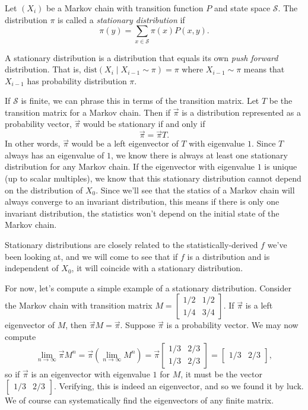\documentclass{problemset}
\newcommand{\mat}[1]{\begin{bmatrix}#1\end{bmatrix}}
\begin{document}
	\begin{definition}
		Let $(X_i)$ be a Markov chain with transition function $P$ and state space $\mathcal S$.  The distribution $\pi$
		is called a \emph{stationary distribution} if
		\[
			\pi(y) = \sum_{x\in\mathcal S} \pi(x)P(x,y).
		\]
	\end{definition}

	A stationary distribution is a distribution that equals its own \emph{push forward} distribution.
	That is, $\text{dist}(X_i\mid X_{i-1}\sim \pi) = \pi$ where $X_{i-1}\sim \pi$ means that $X_{i-1}$
	has probability distribution $\pi$.

	If $\mathcal S$ is finite, we can phrase this in terms of the transition matrix.  Let $T$ be the transition 
	matrix for a Markov chain.  Then if $\vec \pi$ is a distribution represented as a probability vector,
	$\vec\pi$ would be stationary if and only if
	\[
		\vec \pi = \vec \pi T.
	\]
	In other words, $\vec \pi$ would be a left eigenvector of $T$ with eigenvalue $1$.  Since $T$ always has
	an eigenvalue of $1$, we know there is always at least one stationary distribution for any Markov chain.
	If the eigenvector with eigenvalue $1$ is unique (up to scalar multiples), we know that this
	stationary distribution cannot depend on the distribution of $X_0$.  Since we'll
	see that the statics of a Markov chain will always converge to an invariant
	distribution, this means if there is only one invariant distribution, the statistics won't
	depend on the initial state of the Markov chain.

	Stationary distributions are closely related to the statistically-derived $f$
	we've been looking at, and we will come to see that if $f$ is a distribution 
	and is independent of $X_0$,
	it will coincide with a stationary distribution.

	For now, let's compute a simple example of a stationary distribution.  Consider
	the Markov chain with transition matrix $M=\mat{1/2&1/2\\1/4 & 3/4}$.  If $\vec \pi$
	is a left eigenvector of $M$, then $\vec \pi M=\vec \pi$.  Suppose $\vec \pi$ is
	a probability vector.  We may now compute 
	\[
		\lim_{n\to\infty} \vec \pi M^n = \vec \pi\left(\lim_{n\to\infty} M^n\right)
		=\vec \pi \mat{1/3 &2/3\\ 1/3&2/3} = \mat{1/3&2/3},
	\]
	so if $\vec \pi$ is an eigenvector with eigenvalue $1$ for $M$, it must be the vector $\mat{1/3&2/3}$.
	Verifying, this is indeed an eigenvector, and so we found it by luck.  We of course can systematically
	find the eigenvectors of any finite matrix.
\end{document}
